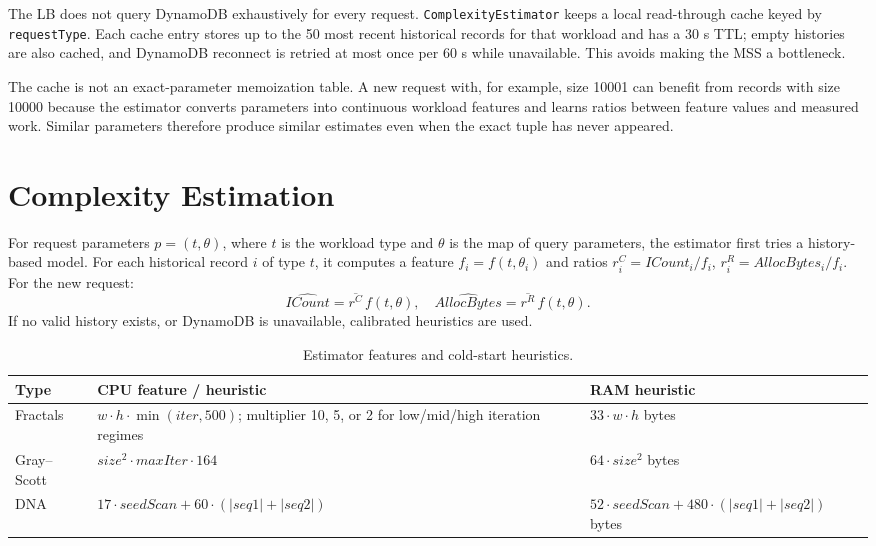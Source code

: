 \documentclass[10pt]{article}
\begin{document}
The LB does not query DynamoDB exhaustively for every request. \texttt{ComplexityEstimator} keeps a local read-through cache keyed by \texttt{requestType}. Each cache entry stores up to the 50 most recent historical records for that workload and has a 30 s TTL; empty histories are also cached, and DynamoDB reconnect is retried at most once per 60 s while unavailable. This avoids making the MSS a bottleneck.

The cache is not an exact-parameter memoization table. A new request with, for example, size 10001 can benefit from records with size 10000 because the estimator converts parameters into continuous workload features and learns ratios between feature values and measured work. Similar parameters therefore produce similar estimates even when the exact tuple has never appeared.

\section{Complexity Estimation}

For request parameters $p=(t,\theta)$, where $t$ is the workload type and $\theta$ is the map of query parameters, the estimator first tries a history-based model. For each historical record $i$ of type $t$, it computes a feature $f_i=f(t,\theta_i)$ and ratios $r^C_i=ICount_i/f_i$, $r^R_i=AllocBytes_i/f_i$. For the new request:
\[
\widehat{ICount}=\overline{r^C}\,f(t,\theta),\quad
\widehat{AllocBytes}=\overline{r^R}\,f(t,\theta).
\]
If no valid history exists, or DynamoDB is unavailable, calibrated heuristics are used.

\begin{table}[H]
\centering
\scriptsize
\caption{Estimator features and cold-start heuristics.}
\begin{tabularx}{\columnwidth}{@{}lYY@{}}
\toprule
Type & CPU feature / heuristic & RAM heuristic \\
\midrule
Fractals & $w\cdot h\cdot \min(iter,500)$; multiplier 10, 5, or 2 for low/mid/high iteration regimes & $33\cdot w\cdot h$ bytes \\
Gray--Scott & $size^2\cdot maxIter\cdot 164$ & $64\cdot size^2$ bytes \\
DNA & $17\cdot seedScan + 60\cdot(|seq1|+|seq2|)$ & $52\cdot seedScan + 480\cdot(|seq1|+|seq2|)$ bytes \\
\bottomrule
\end{tabularx}
\end{table}
\end{document}
